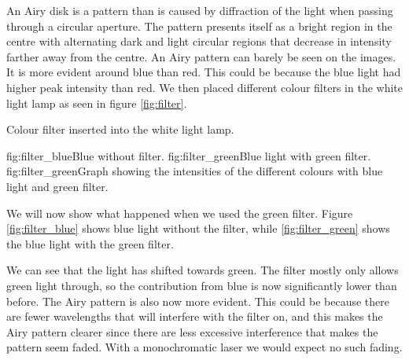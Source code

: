An Airy disk is a pattern than is caused by diffraction of the light when passing through a circular aperture. The pattern presents itself as a bright region in the centre with alternating dark and light circular regions that decrease in intensity farther away from the centre. An Airy pattern can barely be seen on the images. It is more evident around blue than red. This could be because the blue light had higher peak intensity than red. We then placed different colour filters in the white light lamp as seen in figure \vref{fig:filter}.

    {Colour filter inserted into the white light lamp.}

    {fig:filter_blue}{Blue without filter.}
    {fig:filter_green}{Blue light with green filter.}
    {fig:filter_green}{Graph showing the intensities of the different colours with blue light and green filter.}


We will now show what happened when we used the green filter. Figure \vref{fig:filter_blue} shows blue light without the filter, while \vref{fig:filter_green} shows the blue light with the green filter.

We can see that the light has shifted towards green. The filter mostly only allows green light through, so the contribution from blue is now significantly lower than before. The Airy pattern is also now more evident. This could be because there are fewer wavelengths that will interfere with the filter on, and this makes the Airy pattern clearer since there are less excessive interference that makes the pattern seem faded. With a monochromatic laser we would expect no such fading.
